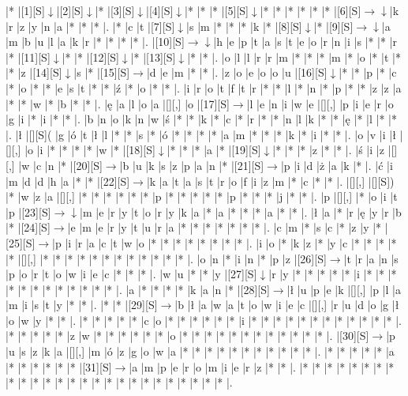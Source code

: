 \documentclass[11pt]{article}
\newcommand\drarr{$\rightarrow \!\!\!\!\! \downarrow$}
\newcommand\rarr{$\rightarrow$}
\newcommand\darr{$\downarrow$}
\begin{document}
\noindent\begin{Puzzle}{25}{25}|*	|[1][S]\darr	|[2][S]\darr	|*	|[3][S]\darr	|[4][S]\darr	|*	|*	|*	|[5][S]\darr	|*	|*	|*	|*	|*	|*	|[6][S]\drarr	|k	|r	|z	|y	|n	|a	|*	|*	|*	|.
|*	|c	|t	|[7][S]\darr	|s	|m	|*	|*	|*	|k	|*	|[8][S]\darr	|*	|[9][S]\drarr	|a	|m	|b	|u	|l	|a	|k	|r	|*	|*	|*	|*	|.
|[10][S]\drarr	|h	|e	|p	|t	|a	|s	|t	|e	|o	|r	|n	|i	|s	|*	|*	|r	|*	|[11][S]\darr	|*	|*	|[12][S]\darr	|*	|[13][S]\darr	|*	|*	|.
|o	|l	|l	|r	|r	|m	|*	|*	|*	|m	|*	|o	|*	|t	|*	|*	|z	|[14][S]\darr	|s	|*	|[15][S]\rarr	|d	|e	|m	|*	|*	|.
|z	|o	|e	|o	|o	|u	|[16][S]\darr	|*	|*	|p	|*	|c	|*	|o	|*	|*	|e	|s	|t	|*	|*	|ź	|*	|o	|*	|*	|.
|i	|r	|o	|t	|f	|t	|r	|*	|*	|l	|*	|n	|*	|p	|*	|*	|z	|z	|a	|*	|*	|w	|*	|b	|*	|*	|.
|ę	|a	|l	|o	|a	|[][,]{ }	|o	|[17][S]\rarr	|l	|e	|n	|i	|w	|e	|[][,]{ }	|p	|i	|e	|r	|o	|g	|i	|*	|i	|*	|*	|.
|b	|n	|o	|k	|n	|w	|ś	|*	|*	|k	|*	|c	|*	|r	|*	|*	|n	|l	|k	|*	|*	|ę	|*	|l	|*	|*	|.
|ł	|[][S](	|g	|ó	|t	|ł	|l	|*	|*	|s	|*	|ó	|*	|*	|*	|*	|a	|m	|*	|*	|*	|k	|*	|i	|*	|*	|.
|o	|v	|i	|ł	|[][,]{ }	|o	|i	|*	|*	|*	|*	|w	|*	|[18][S]\darr	|*	|*	|*	|a	|*	|[19][S]\darr	|*	|*	|*	|z	|*	|*	|.
|ś	|i	|z	|[][,]{ }	|w	|c	|n	|*	|[20][S]\rarr	|b	|u	|k	|s	|z	|p	|a	|n	|*	|[21][S]\rarr	|p	|i	|d	|ż	|a	|k	|*	|.
|ć	|i	|m	|d	|d	|h	|a	|*	|*	|[22][S]\rarr	|k	|a	|t	|a	|s	|t	|r	|o	|f	|i	|z	|m	|*	|c	|*	|*	|.
|[][,]{ }	|[][S])	|*	|w	|z	|a	|[][,]{ }	|*	|*	|*	|*	|*	|*	|p	|*	|*	|*	|*	|*	|p	|*	|*	|*	|j	|*	|*	|.
|p	|[][,]{ }	|*	|o	|i	|t	|p	|[23][S]\drarr	|m	|e	|r	|y	|t	|o	|r	|y	|k	|a	|*	|a	|*	|*	|*	|a	|*	|*	|.
|ł	|a	|*	|r	|ę	|y	|r	|b	|*	|[24][S]\rarr	|e	|m	|e	|r	|y	|t	|u	|r	|a	|*	|*	|*	|*	|*	|*	|*	|.
|c	|m	|*	|s	|c	|*	|z	|y	|*	|[25][S]\rarr	|p	|i	|r	|a	|c	|t	|w	|o	|*	|*	|*	|*	|*	|*	|*	|*	|.
|i	|o	|*	|k	|z	|*	|y	|c	|*	|*	|*	|*	|*	|[][,]{ }	|*	|*	|*	|*	|*	|*	|*	|*	|*	|*	|*	|*	|.
|o	|n	|*	|i	|n	|*	|p	|z	|[26][S]\rarr	|t	|r	|a	|n	|s	|p	|o	|r	|t	|o	|w	|i	|e	|c	|*	|*	|*	|.
|w	|u	|*	|*	|y	|[27][S]\darr	|r	|y	|*	|*	|*	|*	|*	|i	|*	|*	|*	|*	|*	|*	|*	|*	|*	|*	|*	|*	|.
|a	|*	|*	|*	|*	|k	|a	|n	|*	|[28][S]\rarr	|ł	|u	|p	|e	|k	|[][,]{ }	|p	|l	|a	|m	|i	|s	|t	|y	|*	|*	|.
|*	|*	|[29][S]\rarr	|b	|ł	|a	|w	|a	|t	|o	|w	|i	|e	|c	|[][,]{ }	|r	|u	|d	|o	|g	|ł	|o	|w	|y	|*	|*	|.
|*	|*	|*	|*	|*	|c	|o	|*	|*	|*	|*	|*	|*	|i	|*	|*	|*	|*	|*	|*	|*	|*	|*	|*	|*	|*	|.
|*	|*	|*	|*	|*	|z	|w	|*	|*	|*	|*	|*	|*	|o	|*	|*	|*	|*	|*	|*	|*	|*	|*	|*	|*	|*	|.
|[30][S]\rarr	|p	|u	|s	|z	|k	|a	|[][,]{ }	|m	|ó	|z	|g	|o	|w	|a	|*	|*	|*	|*	|*	|*	|*	|*	|*	|*	|*	|.
|*	|*	|*	|*	|*	|a	|*	|*	|*	|*	|*	|*	|[31][S]\rarr	|a	|m	|p	|e	|r	|o	|m	|i	|e	|r	|z	|*	|*	|.
|*	|*	|*	|*	|*	|*	|*	|*	|*	|*	|*	|*	|*	|*	|*	|*	|*	|*	|*	|*	|*	|*	|*	|*	|*	|*	|.\end{Puzzle}
\end{document}
